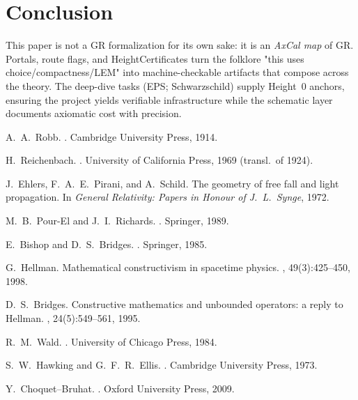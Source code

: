 \documentclass[11pt]{article}
\theoremstyle{definition}
\theoremstyle{remark}
\begin{document}
\section{Conclusion}
This paper is not a GR formalization for its own sake: it is an \emph{AxCal map} of GR. Portals, route flags, and HeightCertificates turn the folklore "this uses choice/compactness/LEM" into machine-checkable artifacts that compose across the theory. The deep-dive tasks (EPS; Schwarzschild) supply Height~0 anchors, ensuring the project yields verifiable infrastructure while the schematic layer documents axiomatic cost with precision.

\begin{thebibliography}{99}

A.~A.~Robb.
.
\newblock Cambridge University Press, 1914.

H.~Reichenbach.
.
\newblock University of California Press, 1969 (transl.\ of 1924).

J.~Ehlers, F.~A.~E.~Pirani, and A.~Schild.
\newblock The geometry of free fall and light propagation.
\newblock In {\em General Relativity: Papers in Honour of J.~L.~Synge}, 1972.

M.~B.~Pour-El and J.~I.~Richards.
.
\newblock Springer, 1989.

E.~Bishop and D.~S.~Bridges.
.
\newblock Springer, 1985.

G.~Hellman.
\newblock Mathematical constructivism in spacetime physics.
, 49(3):425--450, 1998.

D.~S.~Bridges.
\newblock Constructive mathematics and unbounded operators: a reply to Hellman.
, 24(5):549--561, 1995.

R.~M.~Wald.
.
\newblock University of Chicago Press, 1984.

S.~W.~Hawking and G.~F.~R.~Ellis.
.
\newblock Cambridge University Press, 1973.

Y.~Choquet--Bruhat.
.
\newblock Oxford University Press, 2009.

\end{thebibliography}
\appendix
\end{document}
